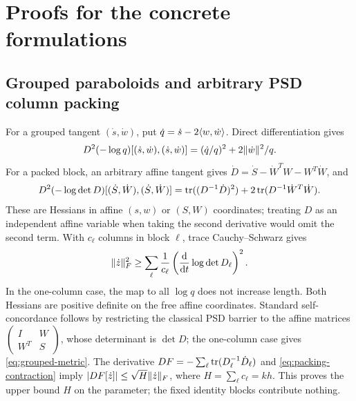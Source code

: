 \section{Proofs for the concrete formulations}
\label{app:formulations}

\subsection{Grouped paraboloids and arbitrary PSD column packing}
For a grouped tangent $(\dot s,\dot w)$, put
$\dot q=\dot s-2\langle w,\dot w\rangle$. Direct differentiation gives
\begin{equation}
 D^2(-\log q)[(\dot s,\dot w),(\dot s,\dot w)]
       =(\dot q/q)^2+2\lVert \dot w\rVert^2/q.
 \label{eq:grouped-metric}
\end{equation}
For a packed block, an arbitrary affine tangent gives
$\dot D=\dot S-\dot W^TW-W^T\dot W$, and
\begin{equation}
 D^2(-\log\det D)[(\dot S,\dot W),(\dot S,\dot W)]
 =\operatorname{tr}((D^{-1}\dot D)^2)
       +2\operatorname{tr}(D^{-1}\dot W^T\dot W).
 \label{eq:packing-metric}
\end{equation}
These are Hessians in affine $(s,w)$ or $(S,W)$ coordinates; treating
$D$ as an independent affine variable when taking the second derivative
would omit the second term. With $c_\ell$ columns in block $\ell$,
trace Cauchy--Schwarz gives
\begin{equation}
 \lVert \dot z\rVert_F^2\geq
 \sum_\ell\frac1{c_\ell}
            \left(\frac{\mathrm d}{\mathrm dt}\log\det D_\ell\right)^2.
 \label{eq:packing-contraction}
\end{equation}
In the one-column case, the map to all $\log q$ does not increase
length.
Both Hessians are positive definite on the free affine coordinates.
Standard self-concordance follows by restricting the classical PSD
barrier to the affine matrices
$\left(\begin{smallmatrix}I&W\\W^T&S\end{smallmatrix}\right)$, whose
determinant is $\det D$; the one-column case gives \eqref{eq:grouped-metric}.
The derivative $DF=-\sum_\ell\operatorname{tr}(D_\ell^{-1}\dot D_\ell)$ and
\eqref{eq:packing-contraction} imply
$|DF[\dot z]|\leq\sqrt H\lVert \dot z\rVert_F$, where
$H=\sum_\ell c_\ell=kh$. This proves the upper bound $H$ on the
parameter; the fixed identity blocks contribute nothing.

